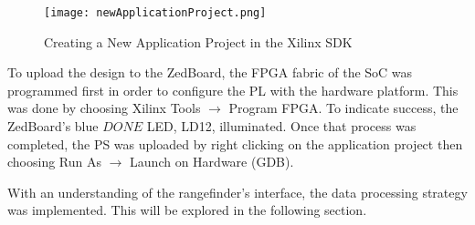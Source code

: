 \begin{figure}[H]
	\centerline{\texttt{[image: newApplicationProject.png]}}
	\caption{Creating a New Application Project in the Xilinx SDK}
	\label{newApplicationProject}
\end{figure}

To upload the design to the ZedBoard, the FPGA fabric of the SoC was programmed first in order to configure the PL with the hardware platform. This was done by choosing Xilinx Tools $\rightarrow$ Program FPGA. To indicate success, the ZedBoard's blue $DONE$ LED, LD12, illuminated. Once that process was completed, the PS was uploaded by right clicking on the application project then choosing Run As $\rightarrow$ Launch on Hardware (GDB).
\par
With an understanding of the rangefinder's interface, the data processing strategy was implemented. This will be explored in the following section.






